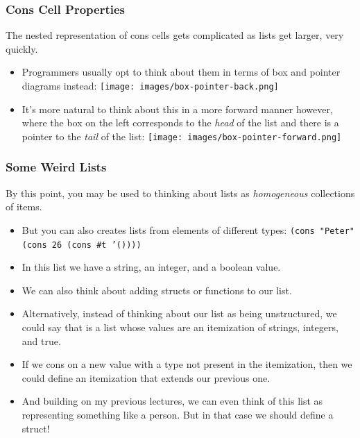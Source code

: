 \documentclass{beamer}
\begin{document}
\begin{frame}
  \frametitle{Cons Cell Properties}
  The nested representation of cons cells gets complicated as lists get larger, very quickly.
  \begin{itemize}
  \item<2-> Programmers usually opt to think about them in terms of box and pointer diagrams instead:
    \texttt{[image: images/box-pointer-back.png]}
  \item<3-> It's more natural to think about this in a more forward manner however, where the box on the
    left corresponds to the \emph{head} of the list and there is a pointer to the \emph{tail} of the list:
    \texttt{[image: images/box-pointer-forward.png]}
  \end{itemize}
\end{frame}

\begin{frame}
  \frametitle{Some Weird Lists}
  By this point, you may be used to thinking about lists as \emph{homogeneous} collections of items.
  \begin{itemize}
  \item<2-> But you can also creates lists from elements of different types:
    \texttt{(cons "Peter" (cons 26 (cons \#t '())))}
  \item<3-> In this list we have a string, an integer, and a boolean value.
  \item<4-> We can also think about adding structs or functions to our list.
  \item<5-> Alternatively, instead of thinking about our list as being unstructured,
    we could say that is a list whose values are an itemization of strings, integers, and true.
  \item<6-> If we cons on a new value with a type not present in the itemization, then we could define
    an itemization that extends our previous one.
  \item<7-> And building on my previous lectures, we can even think of this list as representing
    something like a person. But in that case we should define a struct!
  \end{itemize}
\end{frame}

\end{document}
